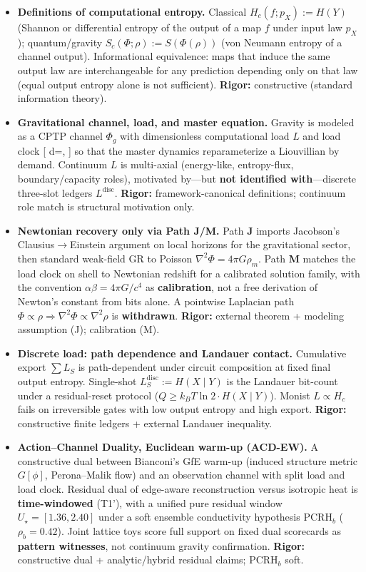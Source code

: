 \documentclass[
  11pt,
]{article}
\begin{document}
\begin{itemize}
\item
  \textbf{Definitions of computational entropy.} Classical \(H_c(f;p_X):=H(Y)\) (Shannon or differential entropy of the output of a map \(f\) under input law \(p_X\)); quantum/gravity \(S_c(\Phi;\rho):=S(\Phi(\rho))\) (von Neumann entropy of a channel output). Informational equivalence: maps that induce the same output law are interchangeable for any prediction depending only on that law (equal output entropy alone is not sufficient). \textbf{Rigor:} constructive (standard information theory).
\item
  \textbf{Gravitational channel, load, and master equation.} Gravity is modeled as a CPTP channel \(\Phi_g\) with dimensionless computational load \(L\) and load clock {[} d\tau=, {]} so that the master dynamics reparameterize a Liouvillian by demand. Continuum \(L\) is multi-axial (energy-like, entropy-flux, boundary/capacity roles), motivated by---but \textbf{not identified with}---discrete three-slot ledgers \(L^{\mathrm{disc}}\). \textbf{Rigor:} framework-canonical definitions; continuum role match is structural motivation only.
\item
  \textbf{Newtonian recovery only via Path J/M.} Path \textbf{J} imports Jacobson's Clausius$\rightarrow$Einstein argument on local horizons for the gravitational sector, then standard weak-field GR to Poisson \(\nabla^2\Phi=4\pi G\rho_m\). Path \textbf{M} matches the load clock on shell to Newtonian redshift for a calibrated solution family, with the convention \(\alpha\beta=4\pi G/c^4\) as \textbf{calibration}, not a free derivation of Newton's constant from bits alone. A pointwise Laplacian path \(\Phi\propto\rho\Rightarrow\nabla^2\Phi\propto\nabla^2\rho\) is \textbf{withdrawn}. \textbf{Rigor:} external theorem + modeling assumption (J); calibration (M).
\item
  \textbf{Discrete load: path dependence and Landauer contact.} Cumulative export \(\sum L_S\) is path-dependent under circuit composition at fixed final output entropy. Single-shot \(L_S^{\mathrm{disc}}:=H(X\mid Y)\) is the Landauer bit-count under a residual-reset protocol (\(Q\ge k_B T\ln 2\cdot H(X\mid Y)\)). Monist \(L\propto H_c\) fails on irreversible gates with low output entropy and high export. \textbf{Rigor:} constructive finite ledgers + external Landauer inequality.
\item
  \textbf{Action--Channel Duality, Euclidean warm-up (ACD-EW).} A constructive dual between Bianconi's GfE warm-up (induced structure metric \(G[\phi]\), Perona--Malik flow) and an observation channel with split load and load clock. Residual dual of edge-aware reconstruction versus isotropic heat is \textbf{time-windowed} (T1'), with a unified pure residual window \(U_\star=[1.36,2.40]\) under a soft ensemble conductivity hypothesis \(\mathrm{PCRH}_b\) (\(\rho_b=0.42\)). Joint lattice toys score full support on fixed dual scorecards as \textbf{pattern witnesses}, not continuum gravity confirmation. \textbf{Rigor:} constructive dual + analytic/hybrid residual claims; \(\mathrm{PCRH}_b\) soft.

\end{itemize}
\end{document}
